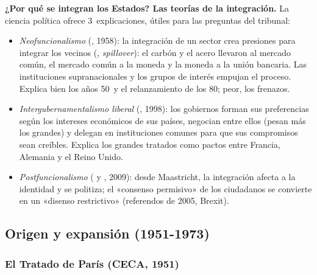 \documentclass[11pt]{article}
\begin{document}
\begin{anotaciones}
\textbf{¿Por qué se integran los Estados? Las teorías de la integración.} La ciencia política ofrece 3~explicaciones, útiles para las preguntas del tribunal:
\begin{itemize}
\item \emph{Neofuncionalismo} (, 1958)\nocite{Haas1958Uniting}: la integración de un sector crea presiones para integrar los vecinos (, \emph{spillover}): el carbón y el acero llevaron al mercado común, el mercado común a la moneda y la moneda a la unión bancaria. Las instituciones supranacionales y los grupos de interés empujan el proceso. Explica bien los años 50~y el relanzamiento de los 80; peor, los frenazos.
\item \emph{Intergubernamentalismo liberal} (, 1998)\nocite{Moravcsik1998Choice}: los gobiernos forman sus preferencias según los intereses económicos de sus países, negocian entre ellos (pesan más los grandes) y delegan en instituciones comunes para que sus compromisos sean creíbles. Explica los grandes tratados como pactos entre Francia, Alemania y el Reino Unido.
\item \emph{Postfuncionalismo} ( y , 2009)\nocite{HoogheMarks2009Postfunctionalist}: desde Maastricht, la integración afecta a la identidad y se politiza; el «consenso permisivo» de los ciudadanos se convierte en un «disenso restrictivo» (referendos de 2005, Brexit).
\end{itemize}
\end{anotaciones}

\subsection{Origen y expansión (1951-1973)}\label{sec:origen}

\subsubsection{El Tratado de París (CECA, 1951)}\label{sec:paris}
\end{document}
